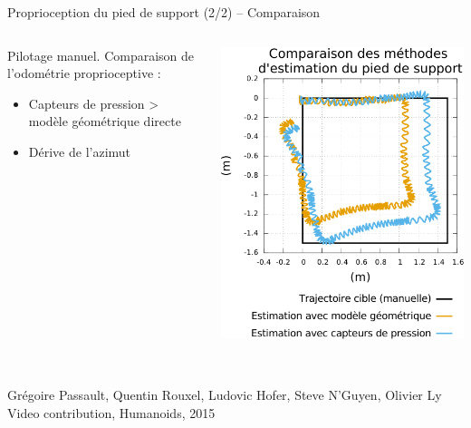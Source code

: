 \begin{frame}{Proprioception du pied de support (2/2) -- Comparaison}
    \begin{columns}
        \begin{column}{0.4\linewidth}
            Pilotage manuel. Comparaison de l'odométrie proprioceptive :
            \vspace{1.0em}
            \begin{itemize}
                \setlength\itemsep{1em}
                \item Capteurs de pression > modèle géométrique directe
                \item Dérive de l'azimut
            \end{itemize}
        \end{column}
        \begin{column}{0.6\linewidth}
            \centering
            \includegraphics[type=pdf,ext=.pdf,read=.pdf,width=0.75\linewidth]{../plot/odometry_pressure_comparison}
        \end{column}
    \end{columns}
    \begin{block}{}
        \\
        \scriptsize
        Grégoire Passault, Quentin Rouxel, Ludovic Hofer, Steve N'Guyen, Olivier Ly\\
        Video contribution, Humanoids, 2015\\
    \end{block}
\end{frame}

